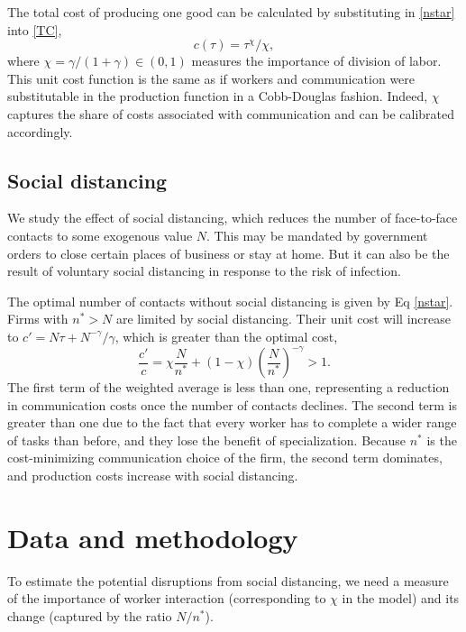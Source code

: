 \documentclass[10pt,letterpaper]{article}
\begin{document}
The total cost of producing one good can be calculated by substituting in \eqref{nstar} into \eqref{TC},
\begin{equation}\label{cost}
	c(\tau) = \tau^{\chi}/\chi,
\end{equation}
where $\chi=\gamma/(1+\gamma)\in(0,1)$ measures the importance of division of labor. This unit cost function is the same as if workers and communication were substitutable in the production function in a Cobb-Douglas fashion. Indeed, $\chi$ captures the share of costs associated with communication and can be calibrated accordingly.

\subsection*{Social distancing}

We study the effect of social distancing, which reduces the number of face-to-face contacts to some exogenous value $N$. This may be mandated by government orders to close certain places of business or stay at home. But it can also be the result of voluntary social distancing in response to the risk of infection. 

The optimal number of contacts without social distancing is given by Eq \eqref{nstar}. Firms with $n^*>N$ are limited by social distancing. Their unit cost will increase to $c' = N \tau + N^{-\gamma}/\gamma$, which is greater than the optimal cost,
\begin{equation}\label{socdist}
\frac{c'}{c} 
	= \chi \frac{N}{n^*} + (1-\chi) \left(\frac{N}{n^*}\right)^{-\gamma}>1.
\end{equation}
The first term of the weighted average is less than one, representing a reduction in communication costs once the number of contacts declines. The second term is greater than one due to the fact that every worker has to complete a wider range of tasks than before, and they lose the benefit of specialization. Because $n^*$ is the cost-minimizing communication choice of the firm, the second term dominates, and production costs increase with social distancing.

\section*{Data and methodology}
To estimate the potential disruptions from social distancing, we need a measure of the importance of worker interaction (corresponding to $\chi$ in the model) and its change (captured by the ratio $N/n^*$). 
\end{document}
